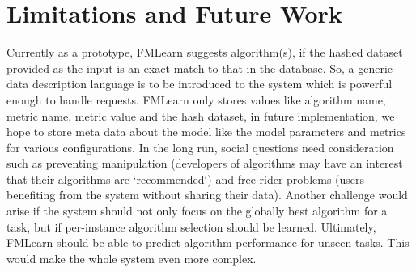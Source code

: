 \documentclass{article}
\begin{document}
\section{Limitations and Future Work}
Currently as a prototype, FMLearn suggests algorithm(s), if the hashed dataset provided as the input is an exact match to that in the database. So, a generic data description language is to be introduced to the system which is powerful enough to handle requests. FMLearn only stores values like algorithm name, metric name, metric value and the hash dataset, in future implementation, we hope to store meta data about the model like the model parameters and metrics for various configurations. In the long run, social questions need consideration such as preventing manipulation (developers of algorithms may have an interest that their algorithms are `recommended`) and free-rider problems (users benefiting from the system without sharing their data). Another challenge would arise if the system should not only focus on the globally best algorithm for a task, but if per-instance algorithm selection should be learned. Ultimately, FMLearn should be able to predict algorithm performance for unseen tasks. This would make the whole system even more complex.
\end{document}
